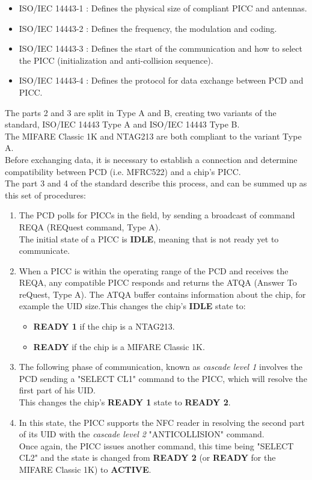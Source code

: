 \documentclass[target=bach,aauheader=,style=]{thud}
\begin{document}
\begin{itemize}
	
	\item ISO/IEC 14443-1 : Defines the physical size of compliant PICC and antennas.
	\item ISO/IEC 14443-2 : Defines the frequency, the modulation and coding.
	\item ISO/IEC 14443-3 : Defines the start of the communication and how to select the PICC (initialization and anti-collision sequence).
	\item ISO/IEC 14443-4 : Defines the protocol for data exchange between PCD and PICC.
\end{itemize}
The parts 2 and 3 are split in Type A and B, creating two variants of the standard, ISO/IEC 14443 Type A and ISO/IEC 14443 Type B.\\The MIFARE Classic 1K and NTAG213 are both compliant to the variant Type A.\\
Before exchanging data, it is necessary to establish a connection and determine compatibility between PCD (i.e. MFRC522) and a chip's PICC. \\The part 3 and 4 of the standard describe this process, and can be summed up as this set of procedures:
\begin{enumerate}
	\item The PCD polls for PICCs in the field, by sending a broadcast of command REQA (REQuest command, Type A). \\The initial state of a PICC is \textbf{IDLE}, meaning that is not ready yet to communicate.
	\item When a PICC is within the operating range of the PCD and receives the REQA, any compatible PICC responds and returns the ATQA (Answer To reQuest, Type A). The ATQA buffer contains information about the chip, for example the UID size.\newline This changes the chip's \textbf{IDLE} state to:
	\begin{itemize}
		\item \textbf{READY 1} if the chip is a NTAG213.
		\item \textbf{READY} if the chip is a MIFARE Classic 1K.
	\end{itemize}
	
	\item The following phase of communication, known as \emph{cascade level 1} involves the PCD sending a "SELECT CL1" command to the PICC, which will resolve the first part of his UID. \\This changes the chip's \textbf{READY 1} state to \textbf{READY 2}.
	\item In this state, the PICC supports the NFC reader in resolving the second part of its UID with the \emph{cascade level 2} "ANTICOLLISION" command.\\
	Once again, the PICC issues another command, this time being "SELECT CL2" and the state is changed from \textbf{READY 2} (or \textbf{READY} for the MIFARE Classic 1K) to \textbf{ACTIVE}.
		
\end{enumerate}
\end{document}
